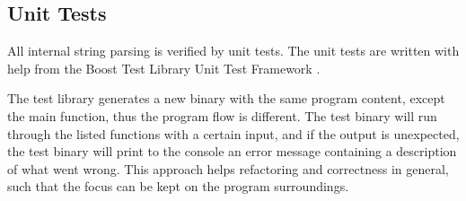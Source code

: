 \subsection{Unit Tests}

All internal string parsing is verified by unit tests. The unit tests
are written with help from the Boost Test Library Unit Test Framework \cite{boostunittest}.

The test library generates a new binary with the same program content, except the
main function, thus the program flow is different. The test binary will
run through the listed functions with a certain input, and if the output is unexpected,
the test binary will print to the console an error message containing a description of what
went wrong. This approach helps refactoring and correctness in general, such that
the focus can be kept on the program surroundings.

